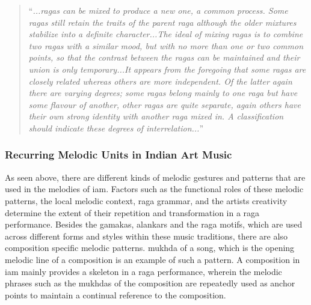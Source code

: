 \blockquote{``\textit{...\Glspl{raga} can be mixed to produce a new one, a common process. Some \glspl{raga} still retain the traits of the parent \gls{raga} although the older mixtures stabilize into a definite character...The ideal of mixing \glspl{raga} is to combine two \glspl{raga} with a similar mood, but with no more than one or two common points, so that the contrast between the \glspl{raga} can be maintained and their union is only temporary...It appears from the foregoing that some \glspl{raga} are closely related whereas others are more independent. Of the latter again there are varying degrees; some \glspl{raga} belong mainly to one \gls{raga} but have some flavour of another, other \glspl{raga} are quite separate, again others have their own strong identity with another \gls{raga} mixed in. A classification should indicate these degrees of interrelation...}''}






\subsubsection{Recurring Melodic Units in Indian Art Music}
\label{sec:recurring_melodic_patterns_iam}

As seen above, there are different kinds of melodic gestures and patterns that are used in the melodies of \gls{iam}. Factors such as the functional roles of these melodic patterns, the local melodic context, \gls{raga} grammar, and the artists creativity determine the extent of their repetition and transformation in a \gls{raga} performance. Besides the \glspl{gamaka}, \glspl{alankar} and the \gls{raga} motifs, which are used across different forms and styles within these music traditions, there are also composition specific melodic patterns. \Gls{mukhda} of a song, which is the opening melodic line of a composition is an example of such a pattern. A composition in \gls{iam} mainly provides a skeleton in a \gls{raga} performance, wherein the melodic phrases such as the \glspl{mukhda} of the composition are repeatedly used as anchor points to maintain a continual reference to the composition.%

